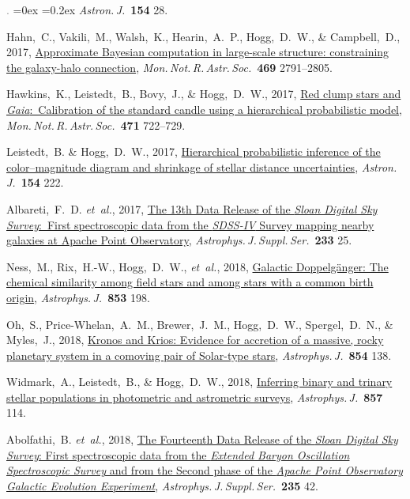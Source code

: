 \documentclass[12pt,letterpaper]{article}
\newcommand{\latin}[1]{\textsl{#1}}
\newcommand{\etal}{\latin{et~al.}}
\newcommand{\project}[1]{\textsl{#1}}
\newcommand{\doi}[2]{\href{http://dx.doi.org/#1}{{#2}}}
\newcommand{\deemph}[1]{\textcolor{grey}{\footnotesize{#1}}}
\newcommand{\pubnumber}[1]{\deemph{{#1}.}}
\newcounter{refpubnum}
\newcommand{\hogglist}{%
    \rightmargin=0in
    \leftmargin=0.18in
    \topsep=0ex
    \partopsep=0pt
    \itemsep=0.2ex
    \parsep=0pt
    \itemindent=-1.0\leftmargin
    \listparindent=0.0\leftmargin
    \settowidth{\labelsep}{~}
    \usecounter{refpubnum}
  }
\begin{document}
\begin{list}{\pubnumber{\therefpubnum}}{\hogglist}
\textit{Astron.\,J.}\ \textbf{154} 28.
\item
Hahn,~C., Vakili,~M., Walsh,~K., Hearin,~A.~P., Hogg,~D.~W., \& Campbell,~D., 2017,
\doi{10.1093/mnras/stx894}{Approximate Bayesian computation in large-scale structure: constraining the galaxy-halo connection},
\textit{Mon.\,Not.\,R.\,Astr.\,Soc.}\ \textbf{469} 2791--2805.
\item
Hawkins,~K., Leistedt,~B., Bovy,~J., \& Hogg,~D.~W., 2017,
\doi{10.1093/mnras/stx1655}{Red clump stars and \project{Gaia}:\ Calibration of the standard candle using a hierarchical probabilistic model},
\textit{Mon.\,Not.\,R.\,Astr.\,Soc.}\ \textbf{471} 722--729.
\item
Leistedt,~B. \& Hogg,~D.~W., 2017,
\doi{10.3847/1538-3881/aa91d5}{Hierarchical probabilistic inference of the color--magnitude diagram and shrinkage of stellar distance uncertainties},
\textit{Astron.\,J.}\ \textbf{154} 222.
\item
Albareti,~F.~D. \etal, 2017,
\doi{10.3847/1538-4365/aa8992}{The 13th Data Release of the \project{Sloan Digital Sky Survey}:\ First spectroscopic data from the \project{SDSS-IV} Survey mapping nearby galaxies at Apache Point Observatory},
\textit{Astrophys.\,J.\,Suppl.\,Ser.}\ \textbf{233} 25.
\item
Ness,~M., Rix,~H.-W., Hogg,~D.~W., \etal, 2018,
\doi{10.3847/1538-4357/aa9d8e}{Galactic Doppelg\"anger: The chemical similarity among field stars and among stars with a common birth origin},
\textit{Astrophys.\,J.}\ \textbf{853} 198.
\item
Oh,~S., Price-Whelan,~A.~M., Brewer,~J.~M., Hogg,~D.~W., Spergel,~D.~N., \& Myles,~J., 2018,
\doi{10.3847/1538-4357/aaab4d}{Kronos and Krios: Evidence for accretion of a massive, rocky planetary system in a comoving pair of Solar-type stars},
\textit{Astrophys.\,J.}\ \textbf{854} 138.
\item
Widmark,~A., Leistedt,~B., \& Hogg,~D.~W., 2018,
\doi{10.3847/1538-4357/aab7ee}{Inferring binary and trinary stellar populations in photometric and astrometric surveys},
\textit{Astrophys.\,J.}\ \textbf{857} 114.
\item
Abolfathi,~B. \etal, 2018,
\doi{10.3847/1538-4365/aa9e8a}{The Fourteenth Data Release of the \project{Sloan Digital Sky Survey}: First spectroscopic data from the \project{Extended Baryon Oscillation Spectroscopic Survey} and from the Second phase of the \project{Apache Point Observatory Galactic Evolution Experiment}},
\textit{Astrophys.\,J.\,Suppl.\,Ser.}\ \textbf{235} 42.
\item

\end{list}
\end{document}
